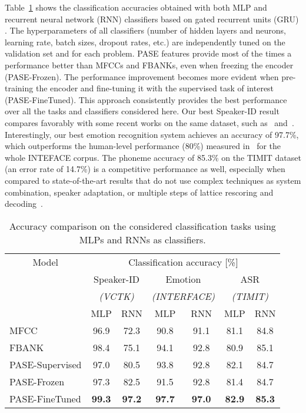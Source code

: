 \documentclass[a4paper]{article}
\begin{document}
Table~\ref{tab:acc_final} shows the classification accuracies obtained with both MLP and recurrent neural network (RNN) classifiers based on gated recurrent units (GRU) \cite{gru}. The hyperparameters of all classifiers (number of hidden layers and neurons, learning rate, batch sizes, dropout rates, etc.) are independently tuned on the validation set and for each problem. 
PASE features provide most of the times a performance better than MFCCs and FBANKs, even when freezing the encoder (PASE-Frozen). The performance improvement becomes more evident when pre-training the encoder and fine-tuning it with the supervised task of interest (PASE-FineTuned). This approach consistently provides the best performance over all the tasks and classifiers considered here. Our best Speaker-ID result compares favorably with some recent works on the same dataset, such as~\cite{VCTK_paper} and~\cite{DilatedRNN}.
Interestingly, our best emotion recognition system achieves an accuracy of 97.7\%, which outperforms the human-level performance (80\%) measured in~\cite{hozjan2002interface} for the whole INTEFACE corpus.  
The phoneme accuracy of 85.3\% on the TIMIT dataset (an error rate of 14.7\%) is a competitive performance as well, especially when compared to state-of-the-art results that do not use complex techniques as system combination, speaker adaptation, or multiple steps of lattice rescoring and decoding~\cite{kaldi_short,pytorch_kaldi,li_gru,TIMIT_survey}.  

\begin{table}[t]
\centering
\caption{Accuracy comparison on the considered classification tasks using MLPs and RNNs as classifiers.}
\label{tab:acc_final}
\setlength{\tabcolsep}{3pt}
\begin{tabular}{l|cccccc}
    \hline 
    \multicolumn{1}{c|}{Model}  & \multicolumn{6}{c}{Classification accuracy [\%]} \\
            &  \multicolumn{2}{c}{Speaker-ID} & \multicolumn{2}{c}{Emotion} & \multicolumn{2}{c}{ASR}\\
           &  \multicolumn{2}{c}{\textit{(VCTK)}}  & \multicolumn{2}{c}{\textit{(INTERFACE)}}         & \multicolumn{2}{c}{\textit{(TIMIT)}}\\ \hline
            &  MLP & RNN & MLP & RNN & MLP & RNN \\
     \hline


MFCC  & 96.9 & 72.3 & 90.8 & 91.1 & 81.1 & 84.8\\

FBANK  & 98.4 & 75.1 & 94.1 & 92.8 & 80.9 & 85.1\\
          
PASE-Supervised  & 97.0 & 80.5 & 93.8 & 92.8 & 82.1 & 84.7 \\
     
     \hline
PASE-Frozen & 97.3 & 82.5 & 91.5 & 92.8 & 81.4 & 84.7\\
     
PASE-FineTuned & \textbf{99.3} & \textbf{97.2}  & \textbf{97.7} & \textbf{97.0} & \textbf{82.9} &  \textbf{85.3}\\
     
     \hline
\end{tabular}
\end{table}
\end{document}
